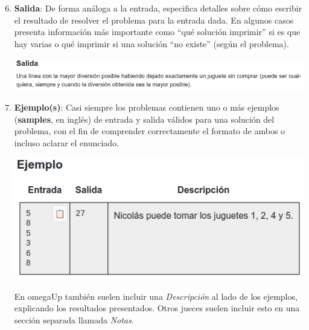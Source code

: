 \documentclass{beamer}
\begin{document}
    \begin{frame}[noframenumbering]
        \begin{enumerate}
            \setcounter{enumi}{5}
            \item \textbf{Salida}: \pause De forma análoga a la entrada, especifica detalles sobre cómo escribir el resultado de resolver el problema para la entrada dada. En algunos casos presenta información más importante como ``qué solución imprimir'' si es que hay varias o qué imprimir si una solución ``no existe'' (según el problema). \pause

            \begin{center}
                \includegraphics[width=.7\linewidth]{./ou_output.png}
            \end{center}\pause

        \item \textbf{Ejemplo(s)}: \pause Casi siempre los problemas contienen uno o más ejemplos (\textbf{samples}, en inglés) de entrada y salida válidos para una solución del problema, con el fin de comprender correctamente el formato de ambos o incluso aclarar el enunciado. \pause

            \begin{center}
                \includegraphics[width=.4\linewidth]{./ou_sample.png}
            \end{center}\pause

            En omegaUp también suelen incluir una \textit{Descripción} al lado de los ejemplos, explicando los resultados presentados. Otros jueces suelen incluir esto en una sección separada llamada \textit{Notas}. 
        \end{enumerate}
    \end{frame}
\end{document}

